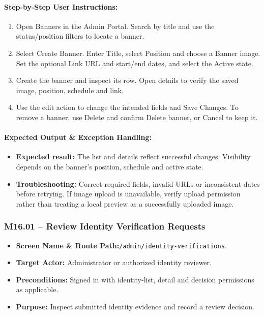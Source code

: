 \paragraph{Step-by-Step User Instructions:}
\begin{enumerate}[leftmargin=1.8em,itemsep=3pt]
  \item {} Open Banners in the Admin Portal. Search by title and use the status/position filters to locate a banner.
  \item {} Select Create Banner. Enter Title, select Position and choose a Banner image. Set the optional Link URL and start/end dates, and select the Active state.
  \item {} Create the banner and inspect its row. Open details to verify the saved image, position, schedule and link.
  \item {} Use the edit action to change the intended fields and Save Changes. To remove a banner, use Delete and confirm Delete banner, or Cancel to keep it.
\end{enumerate}
\paragraph{Expected Output \& Exception Handling:}
\begin{itemize}[leftmargin=1.5em,itemsep=2pt]
  \item \textbf{Expected result:} The list and details reflect successful changes. Visibility depends on the banner's position, schedule and active state.
  \item \textbf{Troubleshooting:} Correct required fields, invalid URLs or inconsistent dates before retrying. If image upload is unavailable, verify upload permission rather than treating a local preview as a successfully uploaded image.
\end{itemize}

\newpage
\subsubsection{M16.01 -- Review Identity Verification Requests}
\begin{itemize}[leftmargin=1.5em,itemsep=2pt]
  \item \textbf{Screen Name \& Route Path:}\newline \texttt{/admin/identity-verifications}.
  \item \textbf{Target Actor:} Administrator or authorized identity reviewer.
  \item \textbf{Preconditions:} Signed in with identity-list, detail and decision permissions as applicable.
  \item \textbf{Purpose:} Inspect submitted identity evidence and record a review decision.
\end{itemize}

